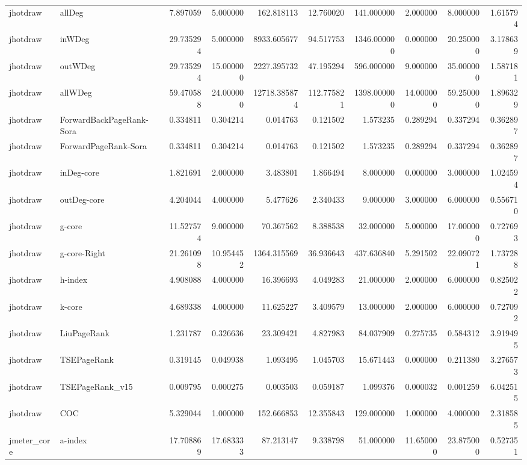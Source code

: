 \begin{tabular}{llrrrrrrrr}
jhotdraw & allDeg & 7.897059 & 5.000000 & 162.818113 & 12.760020 & 141.000000 & 2.000000 & 8.000000 & 1.615794 \\
jhotdraw & inWDeg & 29.735294 & 5.000000 & 8933.605677 & 94.517753 & 1346.000000 & 0.000000 & 20.250000 & 3.178639 \\
jhotdraw & outWDeg & 29.735294 & 15.000000 & 2227.395732 & 47.195294 & 596.000000 & 9.000000 & 35.000000 & 1.587181 \\
jhotdraw & allWDeg & 59.470588 & 24.000000 & 12718.385874 & 112.775821 & 1398.000000 & 14.000000 & 59.250000 & 1.896329 \\
jhotdraw & ForwardBackPageRank-Sora & 0.334811 & 0.304214 & 0.014763 & 0.121502 & 1.573235 & 0.289294 & 0.337294 & 0.362897 \\
jhotdraw & ForwardPageRank-Sora & 0.334811 & 0.304214 & 0.014763 & 0.121502 & 1.573235 & 0.289294 & 0.337294 & 0.362897 \\
jhotdraw & inDeg-core & 1.821691 & 2.000000 & 3.483801 & 1.866494 & 8.000000 & 0.000000 & 3.000000 & 1.024594 \\
jhotdraw & outDeg-core & 4.204044 & 4.000000 & 5.477626 & 2.340433 & 9.000000 & 3.000000 & 6.000000 & 0.556710 \\
jhotdraw & g-core & 11.527574 & 9.000000 & 70.367562 & 8.388538 & 32.000000 & 5.000000 & 17.000000 & 0.727693 \\
jhotdraw & g-core-Right & 21.261098 & 10.954452 & 1364.315569 & 36.936643 & 437.636840 & 5.291502 & 22.090721 & 1.737288 \\
jhotdraw & h-index & 4.908088 & 4.000000 & 16.396693 & 4.049283 & 21.000000 & 2.000000 & 6.000000 & 0.825022 \\
jhotdraw & k-core & 4.689338 & 4.000000 & 11.625227 & 3.409579 & 13.000000 & 2.000000 & 6.000000 & 0.727092 \\
jhotdraw & LiuPageRank & 1.231787 & 0.326636 & 23.309421 & 4.827983 & 84.037909 & 0.275735 & 0.584312 & 3.919495 \\
jhotdraw & TSEPageRank & 0.319145 & 0.049938 & 1.093495 & 1.045703 & 15.671443 & 0.000000 & 0.211380 & 3.276573 \\
jhotdraw & TSEPageRank_v15 & 0.009795 & 0.000275 & 0.003503 & 0.059187 & 1.099376 & 0.000032 & 0.001259 & 6.042515 \\
jhotdraw & COC & 5.329044 & 1.000000 & 152.666853 & 12.355843 & 129.000000 & 1.000000 & 4.000000 & 2.318585 \\
jmeter_core & a-index & 17.708869 & 17.683333 & 87.213147 & 9.338798 & 51.000000 & 11.650000 & 23.875000 & 0.527351 \\

\end{tabular}
